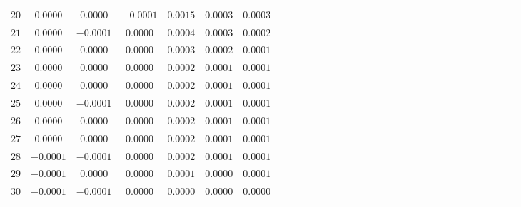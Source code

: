 \begin{table}[!htbp]
\begin{tabular}{c c c c c c c c c c c c c c c c c c c c c c c c c c c c c c c }
$20$ &$   0.0000$&$ 0.0000$&$-0.0001$&$0.0015$&$0.0003$&$0.0003$\\
$21$  &$  0.0000$&$ -0.0001$&$ 0.0000$&$0.0004$&$  0.0003$&$0.0002$\\
$22$&$    0.0000$&$ 0.0000$&$0.0000$&$0.0003$&$0.0002$&$0.0001$\\
$23$ &$   0.0000$&$ 0.0000$&$ 0.0000$&$0.0002$&$0.0001$&$0.0001$\\
$24$  &$  0.0000$&$ 0.0000$&$ 0.0000$&$ 0.0002$&$0.0001$&$0.0001$\\
$25$   &$ 0.0000$&$ -0.0001$&$ 0.0000$&$0.0002$&$ 0.0001$&$0.0001$\\
$26$    &$0.0000$&$ 0.0000$&$0.0000$&$0.0002$&$0.0001$&$0.0001$\\
$27$&$  0.0000$&$ 0.0000$&$ 0.0000$&$0.0002$&$0.0001$&$0.0001$\\
$28$&$    -0.0001$&$ -0.0001$&$0.0000$&$0.0002$&$0.0001$&$0.0001$\\
$29$   &$ -0.0001$&$0.0000$&$0.0000$&$0.0001$&$0.0000$&$0.0001$\\
$30$    &$-0.0001$&$-0.0001$&$0.0000$&$0.0000$&$0.0000$&$0.0000$\\
     \hline 

\end{tabular}
\end{table}



